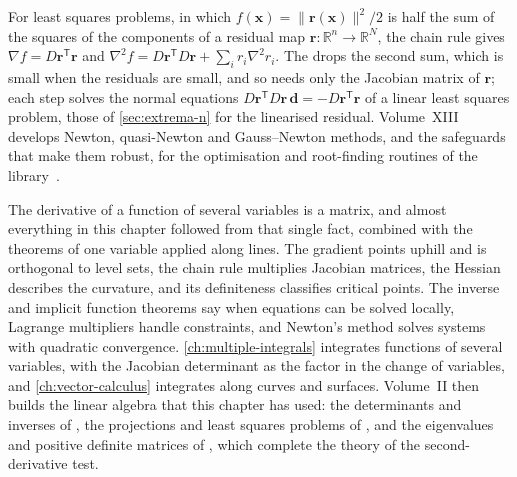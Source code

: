 For least squares problems, in which $f(\mathbf x)=\|\mathbf r(\mathbf x)\|^2/2$ is half the sum of the squares of the components of a residual map $\mathbf r\colon\mathbb R^n\to\mathbb R^N$, the chain rule gives $\nabla f=D\mathbf r^{\mathsf T}\mathbf r$ and $\nabla^2f=D\mathbf r^{\mathsf T}D\mathbf r+\sum_ir_i\nabla^2r_i$. The  drops the second sum, which is small when the residuals are small, and so needs only the Jacobian matrix of $\mathbf r$; each step solves the normal equations $D\mathbf r^{\mathsf T}D\mathbf r\,\mathbf d=-D\mathbf r^{\mathsf T}\mathbf r$ of a linear least squares problem, those of \cref{sec:extrema-n} for the linearised residual. Volume~XIII develops Newton, quasi-Newton and Gauss--Newton methods, and the safeguards that make them robust, for the optimisation and root-finding routines of the library~\cite{dennis1996,nocedal2006}.

\bigskip
The derivative of a function of several variables is a matrix, and almost everything in this chapter followed from that single fact, combined with the theorems of one variable applied along lines. The gradient points uphill and is orthogonal to level sets, the chain rule multiplies Jacobian matrices, the Hessian describes the curvature, and its definiteness classifies critical points. The inverse and implicit function theorems say when equations can be solved locally, Lagrange multipliers handle constraints, and Newton's method solves systems with quadratic convergence. \cref{ch:multiple-integrals} integrates functions of several variables, with the Jacobian determinant as the factor in the change of variables, and \cref{ch:vector-calculus} integrates along curves and surfaces. Volume~II then builds the linear algebra that this chapter has used: the determinants and inverses of , the projections and least squares problems of , and the eigenvalues and positive definite matrices of , which complete the theory of the second-derivative test.

\chapternotes


